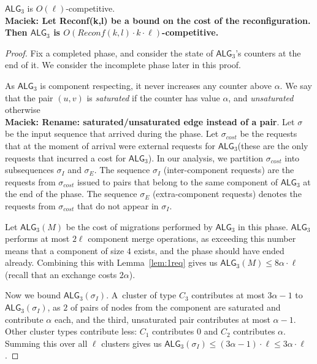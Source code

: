 \documentclass[manuscript,screen=true, review, anonymous]{acmart}
\newcommand{\TAlg}{{\ensuremath{\textsf{ALG}_{3}}}\xspace}
\newcommand\maciek[1]{\color{brown}\textbf{\\ Maciek: #1}\color{black}}
\begin{document}
\begin{theorem}
  \TAlg is $O(\ell)$-competitive.
  \maciek{Let Reconf(k,l) be a bound on the cost of the reconfiguration. Then \TAlg is $O(Reconf(k,l)\cdot k \cdot \ell)$-competitive.}
\end{theorem}
\begin{proof}
  Fix a completed phase, and consider the state of \TAlg's counters at the end of it.
  We consider the incomplete phase later in this proof.

  As \TAlg is component respecting, it never increases any counter above $\alpha$.
  We say that the pair $(u, v)$ is \emph{saturated} if the counter has value $\alpha$, and \emph{unsaturated} otherwise \maciek{Rename: saturated/unsaturated edge instead of a pair}.
  Let $\sigma$ be the input sequence that arrived during the phase.
  Let $\sigma_{cost}$ be the requests that at the moment of arrival were external requests for \TAlg (these are the only requests that incurred a cost for \TAlg).
  In our analysis, we partition $\sigma_{cost}$ into subsequences $\sigma_I$ and $\sigma_E$.
  The sequence $\sigma_I$ (inter-component requests) are the requests from $\sigma_{cost}$ issued to pairs that belong to the same component of \TAlg at the end of the phase.
  The sequence $\sigma_E$ (extra-component requests) denotes the requests from $\sigma_{cost}$ that do not appear in $\sigma_I$.


  Let $\TAlg(M)$ be the cost of migrations performed by \TAlg in this phase.
  \TAlg performs at most $2 \ell$ component merge operations, as
  exceeding this number means that a component of size $4$ exists, and the phase should have ended already.
  Combining this with Lemma~\ref{lem:1req} gives us $\TAlg(M) \leq 8\alpha\cdot\ell$ (recall that an exchange costs $2\alpha$).
  
  Now we bound $\TAlg(\sigma_I)$.
  A~cluster of type $C_3$ contributes at most $3 \alpha - 1$ to $\TAlg(\sigma_I)$, as $2$ of pairs of nodes from the component are saturated and contribute $\alpha$ each, and the third, unsaturated pair contributes at most $\alpha-1$.
  Other cluster types contribute less: $C_1$ contributes $0$ and $C_2$ contributes $\alpha$.
  Summing this over all $\ell$ clusters gives us $\TAlg(\sigma_I) \leq (3 \alpha-1)\cdot \ell \leq 3\alpha\cdot\ell$.


\end{proof}
\end{document}
